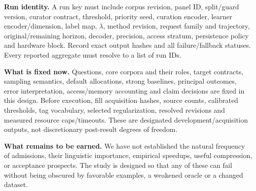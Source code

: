 \documentclass[11pt,a4paper]{article}
\begin{document}
\textbf{Run identity.} A run key must include corpus revision, panel ID, split/guard version, curator contract, threshold, priority seed, curation encoder, learner encoder/dimension, label map, $\lambda$, method revision, request family and trajectory, original/remaining horizon, decoder, precision, access stratum, persistence policy and hardware block. Record exact output hashes and all failure/fallback statuses. Every reported aggregate must resolve to a list of run IDs.

\textbf{What is fixed now.} Questions, core corpora and their roles, target contracts, sampling semantics, default allocations, strong baselines, principal outcomes, error interpretation, access/memory accounting and claim decisions are fixed in this design. Before execution, fill acquisition hashes, source counts, calibrated thresholds, tag vocabulary, selected regularization, resolved revisions and measured resource caps/timeouts. These are designated development/acquisition outputs, not discretionary post-result degrees of freedom.

\textbf{What remains to be earned.} We have not established the natural frequency of admissions, their linguistic importance, empirical speedups, useful compression, or acceptance prospects. The study is designed so that any of these can fail without being obscured by favorable examples, a weakened oracle or a changed dataset.
\end{document}
